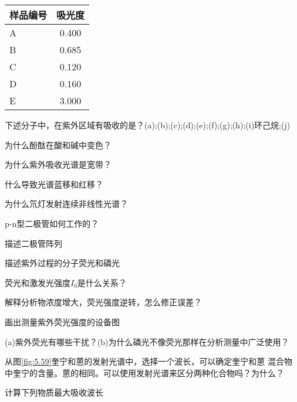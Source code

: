 \begin{problemset}
    \begin{center}
    \begin{tabular}{lc}
        \hline
        样品编号  &  吸光度 \\
        \hline
        A & 0.400 \\
        B & 0.685 \\
        C & 0.120 \\
        D & 0.160 \\
        E & 3.000 \\
        \hline
    \end{tabular}
    \end{center}
\item 下述分子中，在紫外区域有吸收的是？(a);(b);(c);(d);(e);(f);(g);(h);(i)环己烷;(j)
\item 为什么酚酞在酸和碱中变色？
\item 为什么紫外吸收光谱是宽带？
\item 什么导致光谱蓝移和红移？
\item 为什么氘灯发射连续非线性光谱？
\item p-n型二极管如何工作的？
\item 描述二极管阵列
\item 描述紫外过程的分子荧光和磷光
\item 荧光和激发光强度$I_0$是什么关系？
\item 解释分析物浓度增大，荧光强度逆转，怎么修正误差？
\item 画出测量紫外荧光强度的设备图
\item (a)紫外荧光有哪些干扰？(b)为什么磷光不像荧光那样在分析测量中广泛使用？
\item 从图\ref{fig:5.59}奎宁和蒽的发射光谱中，选择一个波长，可以确定奎宁和蒽
    混合物中奎宁的含量。蒽的相同。可以使用发射光谱来区分两种化合物吗？为什么？
\item 计算下列物质最大吸收波长
    \begin{figure}[h]

\end{figure}
\end{problemset}
